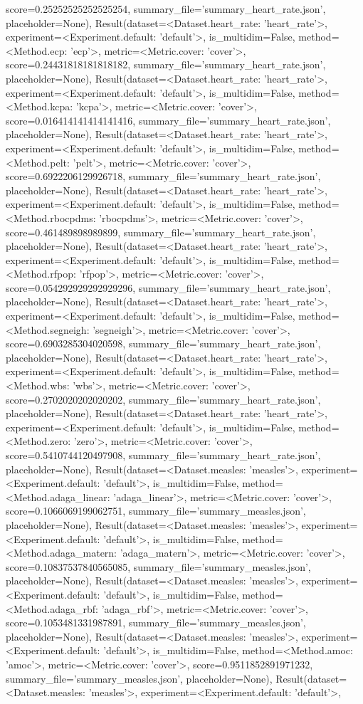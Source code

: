 score=0.25252525252525254, summary_file='summary_heart_rate.json', placeholder=None), Result(dataset=<Dataset.heart_rate: 'heart_rate'>, experiment=<Experiment.default: 'default'>, is_multidim=False, method=<Method.ecp: 'ecp'>, metric=<Metric.cover: 'cover'>, score=0.24431818181818182, summary_file='summary_heart_rate.json', placeholder=None), Result(dataset=<Dataset.heart_rate: 'heart_rate'>, experiment=<Experiment.default: 'default'>, is_multidim=False, method=<Method.kcpa: 'kcpa'>, metric=<Metric.cover: 'cover'>, score=0.016414141414141416, summary_file='summary_heart_rate.json', placeholder=None), Result(dataset=<Dataset.heart_rate: 'heart_rate'>, experiment=<Experiment.default: 'default'>, is_multidim=False, method=<Method.pelt: 'pelt'>, metric=<Metric.cover: 'cover'>, score=0.6922206129926718, summary_file='summary_heart_rate.json', placeholder=None), Result(dataset=<Dataset.heart_rate: 'heart_rate'>, experiment=<Experiment.default: 'default'>, is_multidim=False, method=<Method.rbocpdms: 'rbocpdms'>, metric=<Metric.cover: 'cover'>, score=0.461489898989899, summary_file='summary_heart_rate.json', placeholder=None), Result(dataset=<Dataset.heart_rate: 'heart_rate'>, experiment=<Experiment.default: 'default'>, is_multidim=False, method=<Method.rfpop: 'rfpop'>, metric=<Metric.cover: 'cover'>, score=0.054292929292929296, summary_file='summary_heart_rate.json', placeholder=None), Result(dataset=<Dataset.heart_rate: 'heart_rate'>, experiment=<Experiment.default: 'default'>, is_multidim=False, method=<Method.segneigh: 'segneigh'>, metric=<Metric.cover: 'cover'>, score=0.6903285304020598, summary_file='summary_heart_rate.json', placeholder=None), Result(dataset=<Dataset.heart_rate: 'heart_rate'>, experiment=<Experiment.default: 'default'>, is_multidim=False, method=<Method.wbs: 'wbs'>, metric=<Metric.cover: 'cover'>, score=0.2702020202020202, summary_file='summary_heart_rate.json', placeholder=None), Result(dataset=<Dataset.heart_rate: 'heart_rate'>, experiment=<Experiment.default: 'default'>, is_multidim=False, method=<Method.zero: 'zero'>, metric=<Metric.cover: 'cover'>, score=0.5410744120497908, summary_file='summary_heart_rate.json', placeholder=None), Result(dataset=<Dataset.measles: 'measles'>, experiment=<Experiment.default: 'default'>, is_multidim=False, method=<Method.adaga_linear: 'adaga_linear'>, metric=<Metric.cover: 'cover'>, score=0.1066069199062751, summary_file='summary_measles.json', placeholder=None), Result(dataset=<Dataset.measles: 'measles'>, experiment=<Experiment.default: 'default'>, is_multidim=False, method=<Method.adaga_matern: 'adaga_matern'>, metric=<Metric.cover: 'cover'>, score=0.10837537840565085, summary_file='summary_measles.json', placeholder=None), Result(dataset=<Dataset.measles: 'measles'>, experiment=<Experiment.default: 'default'>, is_multidim=False, method=<Method.adaga_rbf: 'adaga_rbf'>, metric=<Metric.cover: 'cover'>, score=0.1053481331987891, summary_file='summary_measles.json', placeholder=None), Result(dataset=<Dataset.measles: 'measles'>, experiment=<Experiment.default: 'default'>, is_multidim=False, method=<Method.amoc: 'amoc'>, metric=<Metric.cover: 'cover'>, score=0.9511852891971232, summary_file='summary_measles.json', placeholder=None), Result(dataset=<Dataset.measles: 'measles'>, experiment=<Experiment.default: 'default'>, 